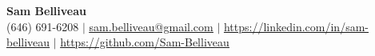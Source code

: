 \begin{center}
    \textbf{\Huge Sam Belliveau} \\ \vspace{1pt}
    \small (646) 691-6208 $|$ 
    \href{mailto:sam.belliveau@gmail.com}{\underline{sam.belliveau@gmail.com}} $|$ 
    \href{https://www.linkedin.com/in/sam-belliveau}{\underline{https://linkedin.com/in/sam-belliveau}} $|$
    \href{https://www.github.com/Sam-Belliveau}{\underline{https://github.com/Sam-Belliveau}}
\end{center}